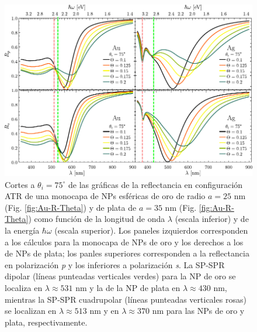 	\begin{figure}[h!]\centering
	\includegraphics[scale=1]{2-Resultados/figs/6-AuThetaVar/0-cut75_Au_Aug.pdf}\vspace*{-.5em}
	\caption{Cortes a $\theta_i = 75^\circ$ de las gráficas de  la reflectancia  en configuración ATR  de una monocapa de NPs esféricas de oro de radio $a=25$ nm (Fig. \ref{fig:Au-R-Theta}) y de plata de $a=35$ nm (Fig. \ref{fig:Au-R-Theta}) como función de la longitud de onda $\lambda$ (escala inferior) y de la energía $\hbar\omega$ (escala superior). Los paneles izquierdos corresponden a los cálculos para la monocapa de NPs de oro y los derechos a los de NPs de plata; los panles superiores corresponden a la reflectancia en polarización \emph{p} y los inferiores a polarización \emph{s}. La SP-SPR dipolar (líneas punteadas verticales verdes) para la NP de oro se localiza en  $\lambda \approx 531$ nm y la de la NP de plata en $\lambda\approx430$ nm, mientras la SP-SPR cuadrupolar (líneas punteadas verticales rosas) se localizan en $\lambda\approx513$ nm y en $\lambda\approx370$ nm para las NPs de oro y plata, respectivamente.}\label{fig:AuAg-Cuts-75}
	\end{figure}	

